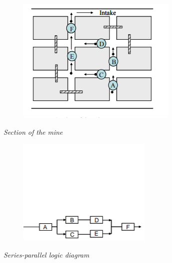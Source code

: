 \documentclass[journal]{IEEEtran}
\begin{document}
\begin{enumerate}
\begin{center}
\begin{minipage}{0.45\textwidth}
\centering
\begin{figure}[H]
    \centering
\includegraphics[width=\textwidth]{Screenshot_2025_0816_114426.png} \\ 
\caption{}
    \label{fig:Q4}
    \end{figure}
\textit{Section of the mine}
\end{minipage}
\hfill
\begin{minipage}{0.45\textwidth}
\centering
\begin{figure}[H]
    \centering
\includegraphics[width=\textwidth]{Screenshot_2025_0816_114537.png} \\ 
\caption{}
    \label{fig:Q4}
    \end{figure}
\textit{Series-parallel logic diagram}
\end{minipage}
\end{center}



\end{enumerate}
\end{document}
